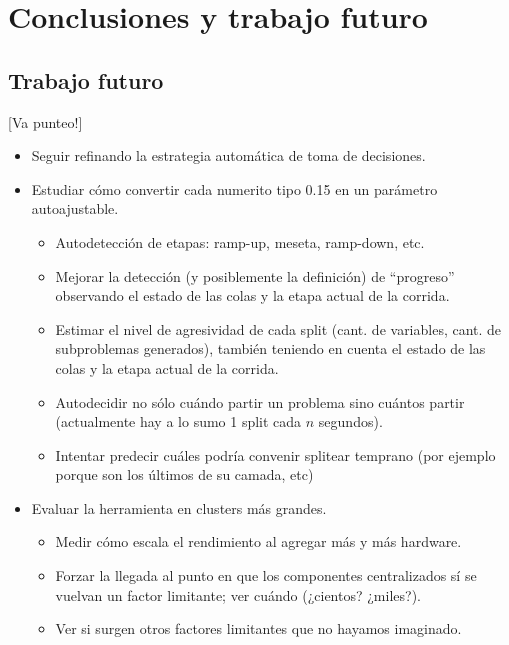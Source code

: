 \chapter{Conclusiones y trabajo futuro}
\label{conclu}

\section{Trabajo futuro}

[Va punteo!]

\begin{itemize}

\item Seguir refinando la estrategia automática de toma de decisiones.
\item Estudiar cómo convertir cada numerito tipo 0.15 en un parámetro autoajustable.

	\begin{itemize}
		\item Autodetección de etapas: ramp-up, meseta, ramp-down, etc.
		\item Mejorar la detección (y posiblemente la definición) de ``progreso'' observando el estado de las colas y la etapa actual de la corrida.
		\item Estimar el nivel de agresividad de cada split (cant. de variables, cant. de subproblemas generados), también teniendo en cuenta el estado de las colas y la etapa actual de la corrida.
		\item Autodecidir no sólo cuándo partir un problema sino cuántos partir (actualmente hay a lo sumo 1 split cada $n$ segundos).
		\item Intentar predecir cuáles podría convenir splitear temprano (por ejemplo porque son los últimos de su camada, etc)
	\end{itemize}

\item Evaluar la herramienta en clusters más grandes.

	\begin{itemize}
	\item Medir cómo escala el rendimiento al agregar más y más hardware.
	\item Forzar la llegada al punto en que los componentes centralizados sí se vuelvan un factor limitante; ver cuándo (¿cientos? ¿miles?).
	\item Ver si surgen otros factores limitantes que no hayamos imaginado.
	\end{itemize}


\end{itemize}
